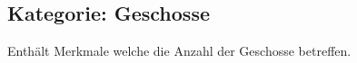 \documentclass{article}
\newcommand{\mml}[1]{\texttt{#1}}
\newcommand{\merkmal}[2]{\subsubsection{\mml{#1}}\label{merkmal:#1}\index{\category! #1}\begin{description}#2\end{description}\medskip}
\newcommand{\erlaeuterung}[1]{\item[Erläuterung]:\\ #1 }
\newcommand{\wert}[1]{\item[Wert]:\\ #1 }
\newcommand{\beispiel}[1]{\item[Beispiele]:\\ #1 }
\newcommand{\rechtsmaterie}[1]{\item[Rechtsmaterie]:  \\#1 }
\newcommand{\notiz}[1]{\item[Bemerkungen]:  \\#1 }
\newcommand{\quelle}[1]{\inVersion{long}{\item[Quelle]: \\#1 }}
\newcommand{\frage}[1]{\inVersion{long}{\item[{\color{red}Frage}]: \\#1 }}
\newcommand{\merkmalref}[1]{\hyperref[merkmal:#1]{\mml{#1}}}
\newcommand{\category}{none}
\newcommand{\versionlength}{short}
\newcommand{\inVersion}[2]{\ifdefstring{\versionlength}{#1}{#2}{
\ifdefstring{\versionlength}{all}{\noindent \textbf{In #1 Version: }
  #2 \textbf{End of  #1 Version}\\}{}
}}
\begin{document}







\subsection{Kategorie: Geschosse}
\label{sec:kategorie:geschosse}

\renewcommand{\category}{Geschosse}

Enthält Merkmale welche die Anzahl der Geschosse betreffen.
\end{document}
